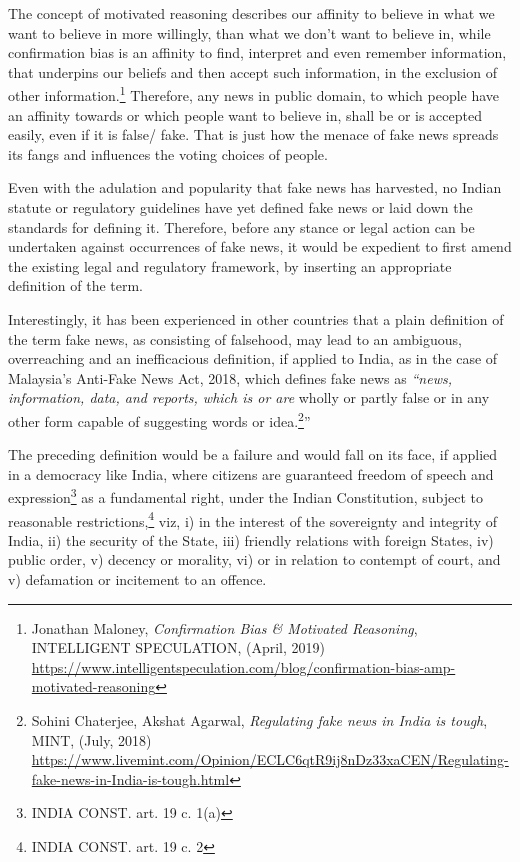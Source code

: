 \begin{multicols}{2}
\noi
The concept of motivated reasoning describes our affinity to believe in what we want to
believe in more willingly, than what we don’t want to believe in, while confirmation bias is
an affinity to find, interpret and even remember information, that underpins our beliefs and
then accept such information, in the exclusion of other information.\footnote{Jonathan Maloney, \textit{Confirmation Bias \& Motivated Reasoning}, INTELLIGENT SPECULATION, (April,
2019) \url{https://www.intelligentspeculation.com/blog/confirmation-bias-amp-motivated-reasoning}} Therefore, any news in
public domain, to which people have an affinity towards or which people want to believe in,
shall be or is accepted easily, even if it is false/ fake. That is just how the menace of fake
news spreads its fangs and influences the voting choices of people.

\noi
Even with the adulation and popularity that fake news has harvested, no Indian statute or
regulatory guidelines have yet defined fake news or laid down the standards for defining it.
Therefore, before any stance or legal action can be undertaken against occurrences of fake news, 
it would be expedient to first amend the existing legal and regulatory framework, by
inserting an appropriate definition of the term.

\noi
Interestingly, it has been experienced in other countries that a plain definition of the term fake
news, as consisting of falsehood, may lead to an ambiguous, overreaching and an
inefficacious definition, if applied to India, as in the case of Malaysia’s Anti-Fake News Act,
2018, which defines fake news as \textit{“news, information, data, and reports, which is or are}
wholly or partly false or in any other form capable of suggesting words or idea.\footnote{Sohini Chaterjee, 
Akshat Agarwal, \textit{Regulating fake news in India is tough}, MINT, (July, 2018) \url{https://www.livemint.com/Opinion/ECLC6qtR9ij8nDz33xaCEN/Regulating-fake-news-in-India-is-tough.html}}”

\noi
The preceding definition would be a failure and would fall on its face, if applied in a
democracy like India, where citizens are guaranteed freedom of speech and expression\footnote{INDIA CONST. art. 19 c. 1(a)} as a
fundamental right, under the Indian Constitution, subject to reasonable restrictions,\footnote{INDIA CONST. art. 19 c. 2} viz, i) in
the interest of the sovereignty and integrity of India, ii) the security of the State, iii) friendly
relations with foreign States, iv) public order, v) decency or morality, vi) or in relation to
contempt of court, and v) defamation or incitement to an offence.


\end{multicols}
